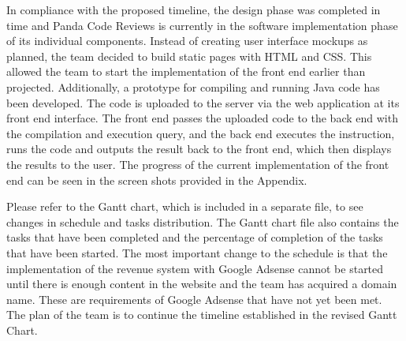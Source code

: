 





In compliance with the proposed timeline, the design phase was completed in time
and Panda Code Reviews is currently in the software implementation phase of its
individual components. Instead of creating user interface mockups as planned,
the team decided to build static pages with HTML and CSS. This allowed the team
to start the implementation of the front end earlier than projected.
Additionally, a prototype for compiling and running Java code has been
developed. The code is uploaded to the server via the web application at its
front end interface. The front end passes the uploaded code to the back end with
the compilation and execution query, and the back end executes the instruction,
runs the code and outputs the result back to the front end, which then displays
the results to the user. The progress of the current implementation of the front
end can be seen in the screen shots provided in the Appendix.

Please refer to the Gantt chart, which is included in a separate file, to see
changes in schedule and tasks distribution. The Gantt chart file also contains
the tasks that have been completed and the percentage of completion of the tasks
that have been started. The most important change to the schedule is that the
implementation of the revenue system with Google Adsense cannot be started until
there is enough content in the website and the team has acquired a domain name.
These are requirements of Google Adsense that have not yet been met. The plan of
the team is to continue the timeline established in the revised Gantt Chart.
